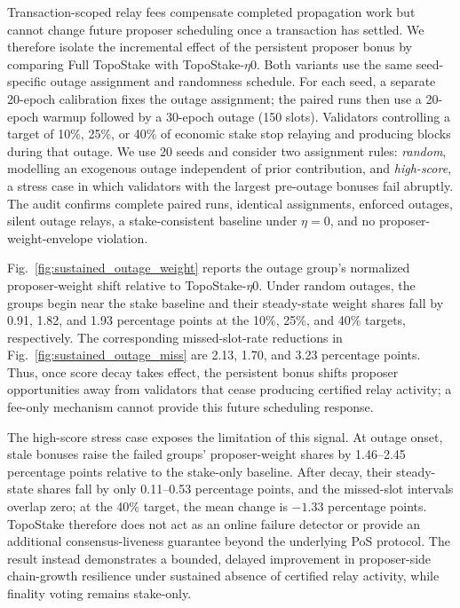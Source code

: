 \documentclass[lettersize,journal]{IEEEtran}
\begin{document}
Transaction-scoped relay fees compensate completed propagation work but cannot change future proposer scheduling once a transaction has settled. We therefore isolate the incremental effect of the persistent proposer bonus by comparing Full TopoStake with TopoStake-$\eta0$. Both variants use the same seed-specific outage assignment and randomness schedule. For each seed, a separate 20-epoch calibration fixes the outage assignment; the paired runs then use a 20-epoch warmup followed by a 30-epoch outage (150 slots). Validators controlling a target of 10\%, 25\%, or 40\% of economic stake stop relaying and producing blocks during that outage. We use 20 seeds and consider two assignment rules: \emph{random}, modelling an exogenous outage independent of prior contribution, and \emph{high-score}, a stress case in which validators with the largest pre-outage bonuses fail abruptly. The audit confirms complete paired runs, identical assignments, enforced outages, silent outage relays, a stake-consistent baseline under $\eta=0$, and no proposer-weight-envelope violation.

Fig.~\ref{fig:sustained_outage_weight} reports the outage group's normalized proposer-weight shift relative to TopoStake-$\eta0$. Under random outages, the groups begin near the stake baseline and their steady-state weight shares fall by 0.91, 1.82, and 1.93 percentage points at the 10\%, 25\%, and 40\% targets, respectively. The corresponding missed-slot-rate reductions in Fig.~\ref{fig:sustained_outage_miss} are 2.13, 1.70, and 3.23 percentage points. Thus, once score decay takes effect, the persistent bonus shifts proposer opportunities away from validators that cease producing certified relay activity; a fee-only mechanism cannot provide this future scheduling response.

The high-score stress case exposes the limitation of this signal. At outage onset, stale bonuses raise the failed groups' proposer-weight shares by 1.46--2.45 percentage points relative to the stake-only baseline. After decay, their steady-state shares fall by only 0.11--0.53 percentage points, and the missed-slot intervals overlap zero; at the 40\% target, the mean change is $-1.33$ percentage points. TopoStake therefore does not act as an online failure detector or provide an additional consensus-liveness guarantee beyond the underlying PoS protocol. The result instead demonstrates a bounded, delayed improvement in proposer-side chain-growth resilience under sustained absence of certified relay activity, while finality voting remains stake-only.
\end{document}
